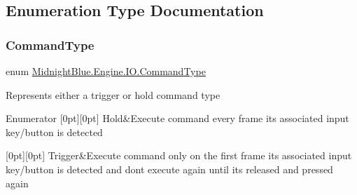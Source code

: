 \subsection{Enumeration Type Documentation}
\hypertarget{namespace_midnight_blue_1_1_engine_1_1_i_o_a8bc3f159399ecadd590f7df1b54354b0}{}\label{namespace_midnight_blue_1_1_engine_1_1_i_o_a8bc3f159399ecadd590f7df1b54354b0} 
\subsubsection{\texorpdfstring{Command\+Type}{CommandType}}
{\footnotesize\ttfamily enum \hyperlink{namespace_midnight_blue_1_1_engine_1_1_i_o_a8bc3f159399ecadd590f7df1b54354b0}{Midnight\+Blue.\+Engine.\+I\+O.\+Command\+Type}\hspace{0.3cm}{\ttfamily [strong]}}



Represents either a trigger or hold command type 

\begin{DoxyEnumFields}{Enumerator}
[0pt][0pt]{}\hypertarget{namespace_midnight_blue_1_1_engine_1_1_i_o_a8bc3f159399ecadd590f7df1b54354b0abcd8db575b47c838e5d551e3973db4ac}{}\label{namespace_midnight_blue_1_1_engine_1_1_i_o_a8bc3f159399ecadd590f7df1b54354b0abcd8db575b47c838e5d551e3973db4ac} 
Hold&Execute command every frame its associated input key/button is detected \\
\hline

[0pt][0pt]{}\hypertarget{namespace_midnight_blue_1_1_engine_1_1_i_o_a8bc3f159399ecadd590f7df1b54354b0af698f67f5666aff10729d8a1cb1c14d2}{}\label{namespace_midnight_blue_1_1_engine_1_1_i_o_a8bc3f159399ecadd590f7df1b54354b0af698f67f5666aff10729d8a1cb1c14d2} 
Trigger&Execute command only on the first frame its associated input key/button is detected and don\textquotesingle{}t execute again until it\textquotesingle{}s released and pressed again \\
\hline

\end{DoxyEnumFields}
